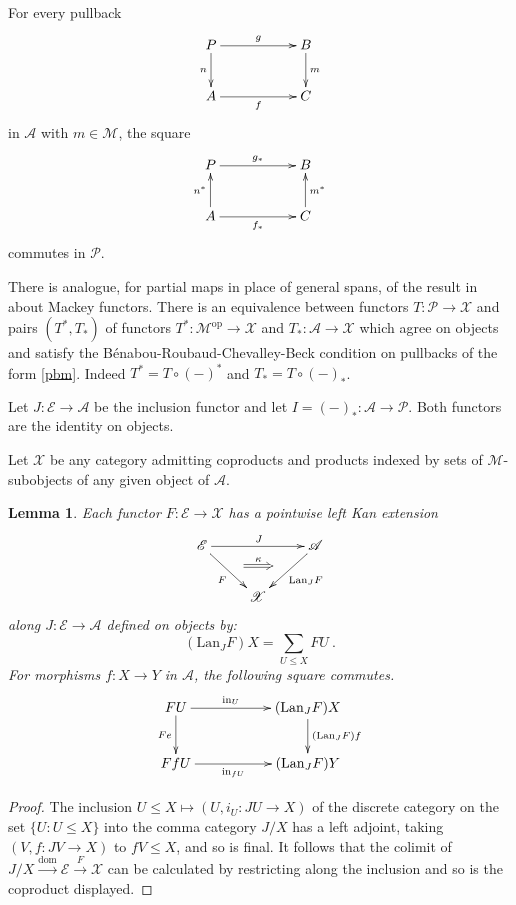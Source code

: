 \documentclass[a4paper,12pt,reqno]{amsart}
\newtheorem{lemma}[theorem]{Lemma}
\theoremstyle{definition}
\theoremstyle{fact}
\theoremstyle{genquest}
\theoremstyle{step}
\newcommand{\dd}{\colon}
\newcommand{\lra}{\longrightarrow}
\newcommand{\ra}{\rightarrow}
\def\CA{{\mathscr A}}
\def\CE{{\mathscr E}}
\def\CM{{\mathscr M}}
\def\CP{{\mathscr P}}
\def\CX{{\mathscr X}}
\begin{document}
For every pullback
\begin{equation}\label{pbm}
\xymatrix{
P \ar[rr]^-{g} \ar[d]_-{n} && B \ar[d]^-{m} \\
A \ar[rr]_-{f} && C}
\end{equation}
in $\CA$ with $m\in \CM$, the square
\begin{equation}
\xymatrix{
P \ar[rr]^-{g_*}  && B  \\
A \ar[rr]_-{f_*} \ar[u]^-{n^*} && C \ar[u]_-{m^*}}
\end{equation}
commutes in $\CP$. 

There is analogue, for partial maps in place of general spans, of the result in
\cite{Lindner1976} about Mackey functors.
There is an equivalence between functors $T \dd \CP \lra \CX$
and pairs $(T^*,T_*)$ of functors 
$T^* \dd \CM^{\mathrm{op}} \lra \CX$
and $T_* \dd \CA \lra \CX$
which agree on objects and satisfy the B\'enabou-Roubaud-Chevalley-Beck condition on pullbacks of the form \eqref{pbm}. 
Indeed $T^*=T\circ (-)^*$ and $T_*=T\circ (-)_*$. 
  
Let $J\dd \CE \ra \CA$ be the inclusion functor and let $I = (-)_* \dd \CA \ra \CP$.
Both functors are the identity on objects.

Let $\CX$ be any category admitting coproducts and products indexed by
sets of $\CM$-subobjects of any given object of $\CA$.

\begin{lemma}\label{leftKan}
Each functor $F\dd \CE \ra \CX$ has a pointwise left Kan extension
\begin{equation}
\begin{aligned}
\xymatrix{
\CE \ar[rd]_{F}^(0.5){\phantom{a}}="1" \ar[rr]^{J}  && \CA \ar[ld]^{\mathrm{Lan}_JF}_(0.5){\phantom{a}}="2" \ar@{=>}"1";"2"^-{\kappa}
\\
& \CX 
}
\end{aligned}
\end{equation} 
along $J\dd \CE \ra \CA$ defined on objects by:
$$(\mathrm{Lan}_JF)X = \sum_{U\le X}FU \ .$$
For morphisms $f \dd X\ra Y$ in $\CA$, the following square commutes.
\begin{equation}
\begin{aligned}
\xymatrix{
FU \ar[rr]^-{\mathrm{in}_U} \ar[d]_-{Fe} && (\mathrm{Lan}_JF)X \ar[d]^-{(\mathrm{Lan}_JF)f} \\
FfU \ar[rr]_-{\mathrm{in}_{fU}} && (\mathrm{Lan}_JF)Y}
\end{aligned}
\end{equation}
\end{lemma}
\begin{proof}
The inclusion $U\le X \mapsto (U, i_U \dd JU\ra X)$ 
of the discrete category on the set $\{U \dd U\le X\}$ into the comma category
$J/X$ has a left adjoint, taking $(V,f\dd JV\ra X)$ to $fV\le X$, and so is final. 
It follows that the colimit of 
$J/X \stackrel{\mathrm{dom}}\lra \CE \stackrel{F}\lra \CX$
can be calculated by restricting along the inclusion and so is the coproduct displayed.
\end{proof}
\end{document}
